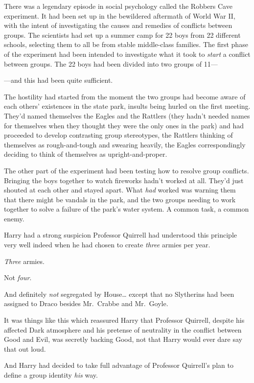 There was a legendary episode in social psychology called the Robbers Cave 
experiment. It had been set up in the bewildered aftermath of World War II, 
with the intent of investigating the causes and remedies of conflicts between 
groups. The scientists had set up a summer camp for 22 boys from 22 different 
schools, selecting them to all be from stable middle-class families. The first 
phase of the experiment had been intended to investigate what it took to 
\emph{start} a conflict between groups. The 22 boys had been divided into two 
groups of 11---

---and this had been quite sufficient.

The hostility had started from the moment the two groups had become aware of 
each others' existences in the state park, insults being hurled on the first 
meeting. They'd named themselves the Eagles and the Rattlers (they hadn't 
needed names for themselves when they thought they were the only ones in the 
park) and had proceeded to develop contrasting group stereotypes, the Rattlers 
thinking of themselves as rough-and-tough and swearing heavily, the Eagles 
correspondingly deciding to think of themselves as upright-and-proper.

The other part of the experiment had been testing how to resolve group 
conflicts. Bringing the boys together to watch fireworks hadn't worked at all. 
They'd just shouted at each other and stayed apart. What \emph{had} worked was 
warning them that there might be vandals in the park, and the two groups 
needing to work together to solve a failure of the park's water system. A 
common task, a common enemy.

Harry had a strong suspicion Professor Quirrell had understood this principle 
very well indeed when he had chosen to create \emph{three} armies per year.

\emph{Three} armies.

Not \emph{four}.

And definitely \emph{not} segregated by House{\ldots} except that no Slytherins 
had been assigned to Draco besides Mr.~Crabbe and Mr.~Goyle.

It was things like this which reassured Harry that Professor Quirrell, despite 
his affected Dark atmosphere and his pretense of neutrality in the conflict 
between Good and Evil, was secretly backing Good, not that Harry would ever 
dare say that out loud.

And Harry had decided to take full advantage of Professor Quirrell's plan to 
define a group identity \emph{his} way.

